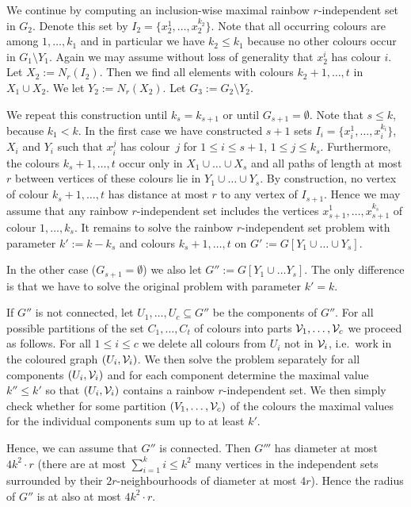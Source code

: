 \documentclass[11pt]{article}
\numberwithin{equation}{section}
\begin{document}
  We continue by computing an inclusion-wise maximal rainbow $r$-independent set in
  $G_2$. Denote this set by $I_2=\{x_2^1,\ldots, x_2^{k_2}\}$. Note
  that all occurring colours are among $1,\ldots, k_1$ and in
  particular we have $k_2\leq k_1$ because no other colours occur in
  $G_1\setminus Y_1$. Again we may assume without loss of generality that $x_2^i$
  has colour $i$. Let $X_2:=N_r(I_2)$. Then we find all elements with
  colours $k_2+1,\ldots, t$ in $X_1\cup X_2$. We let
  $Y_2:=N_r(X_2)$. Let $G_3:=G_2\setminus Y_2$.

  We repeat this construction until $k_s=k_{s+1}$ or until
  $G_{s+1}=\emptyset$. Note that $s\leq k$, because $k_1< k$. In the
  first case we have constructed $s+1$ sets $I_i=\{x_i^1,\ldots,
  x_i^{k_i}\}$, $X_i$ and $Y_i$ such that $x_i^j$ has colour~$j$ for
  $1\leq i\leq s+1$, $1\leq j\leq k_s$. Furthermore, the colours
  $k_s+1,\ldots, t$ occur only in $X_1\cup\ldots\cup X_s$ and all
  paths of length at most $r$ between vertices of these colours lie in
  $Y_1\cup\ldots\cup Y_s$. By construction, no vertex of colour
  $k_s+1,\ldots, t$ has distance at most $r$ to any vertex of
  $I_{s+1}$. Hence we may assume that any rainbow $r$-independent
  set includes the vertices $x_{s+1}^1,\ldots, x_{s+1}^{k_s}$ of
  colour $1,\ldots, k_s$. It remains to solve the rainbow
  $r$-independent set problem with parameter $k':=k-k_s$ and colours
  $k_s+1,\ldots, t$ on $G':=G[Y_1\cup\ldots \cup Y_s]$. 

  In the other case ($G_{s+1}=\emptyset$) we also let
  $G'':=G[Y_1\cup\ldots Y_s]$. The only difference is that we have
  to solve the original problem with parameter $k'=k$. 


  If $G''$ is not connected, let $U_1, \dots, U_c\subseteq G''$ be the
  components of $G''$. For all possible partitions of the set $C_1,
  \dots, C_t$ of colours into parts $\mathcal{V}_1, \dots, \mathcal{V}_c$ we
  proceed as follows. For all $1\leq i\leq c$ we delete all colours
  from $U_i$ not in $\mathcal{V}_i$, i.e.~work in the coloured graph $(U_i,
  \mathcal{V}_i)$. 
  We then solve the problem separately
  for all components $(U_i, \mathcal{V}_i)$ and for each component determine the maximal
  value $k''\leq k'$ so that $(U_i, \mathcal{V}_i)$ contains a rainbow
  $r$-independent set. We then simply check whether for some partition
  $(V_1, \dots, \mathcal{V}_c)$ of the colours the maximal values
  for the individual components sum up to at least $k'$.

  Hence, we can assume
  that $G''$ is connected. 
  Then $G'''$ has diameter at most $4k^2\cdot r$ (there are at
  most $\sum_{i=1}^k i\leq k^2$ many vertices in the independent sets
  surrounded by their $2r$-neighbourhoods of diameter at most
  $4r$). Hence the radius of $G''$ is at also at most $4k^2\cdot
  r$.
\end{document}
